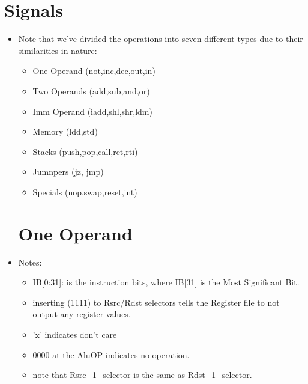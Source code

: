 \documentclass[12pt]{report}
\begin{document}
\section{Signals}

\begin{itemize}
    \item Note that we've divided the operations into seven different types due to their similarities in nature:
    \begin{itemize}
        \item One Operand (not,inc,dec,out,in)
        \item Two Operands (add,sub,and,or)
        \item Imm Operand (iadd,shl,shr,ldm)
        \item Memory (ldd,std)
        \item Stacks (push,pop,call,ret,rti)
        \item Jumnpers (jz, jmp)
        \item Specials (nop,swap,reset,int)
    \end{itemize}
    \section{One Operand}
        \item Notes:
        \begin{itemize}
            \item IB[0:31]: is the instruction bits, where IB[31] is the Most Significant Bit.
            \item inserting (1111) to Rsrc/Rdst selectors tells the Register file to not output any register values.
            \item 'x' indicates don't care
            \item 0000 at the AluOP indicates no operation.
            \item note that Rsrc_1_selector is the same as Rdst_1_selector.
        \end{itemize}


\end{itemize}
\end{document}
